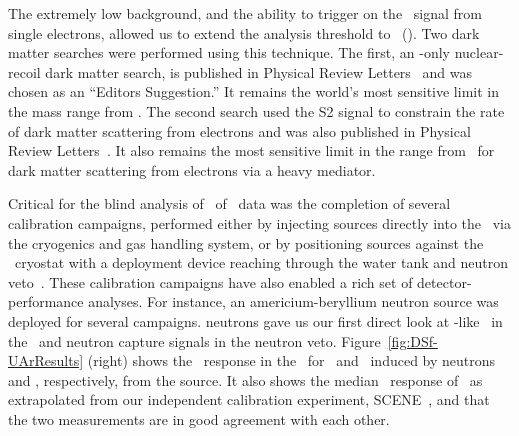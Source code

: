 The extremely low background, and the ability to trigger on the \STwo\ signal from single electrons, allowed us to extend the analysis threshold to \DSfLowMassThresholdEe\ (\DSfLowMassThresholdNr). Two dark matter searches were performed using this technique. The first, an \STwo-only nuclear-recoil dark matter search, is published in Physical Review Letters~\cite{Agnes:2018fg} and was chosen as an ``Editors Suggestion.''  It remains the world's most sensitive limit in the mass range from \DSfLowMassBestRecordRange. The second search used the S2 signal to constrain the rate of dark matter scattering from electrons and was also published in Physical Review Letters~\cite{Agnes:2018ft}.  It also remains the most sensitive limit in the range from \DSfLowMassElectronBestRecordRange\ for dark matter scattering from electrons via a heavy mediator.

Critical for the blind analysis of \DSfDdLTPostQualCut\ of \UAr\ data was the completion of several calibration campaigns, performed either by injecting sources directly into the \LAr\ via the cryogenics and gas handling system, or by positioning sources against the \LArTPC\ cryostat with a deployment device reaching through the water tank and neutron veto~\cite{Agnes:2017ec}.  These calibration campaigns have also enabled a rich set of detector-performance analyses.  For instance, an americium-beryllium neutron source was deployed for several campaigns.   neutrons gave us our first direct look at \WIMP-like \NRs\ in the \LArTPC\ and neutron capture signals in the neutron veto.  Figure~\ref{fig:DSf-UArResults} (right) shows the \FNine\ response in the \LArTPC\ for \NRs\ and \ERs\ induced by neutrons and \grs, respectively, from the  source.  It also shows the median \FNine\ response of \NRs\ as extrapolated from our independent calibration experiment, SCENE~\cite{Cao:2015ks}, and that the two measurements are in good agreement with each other.

